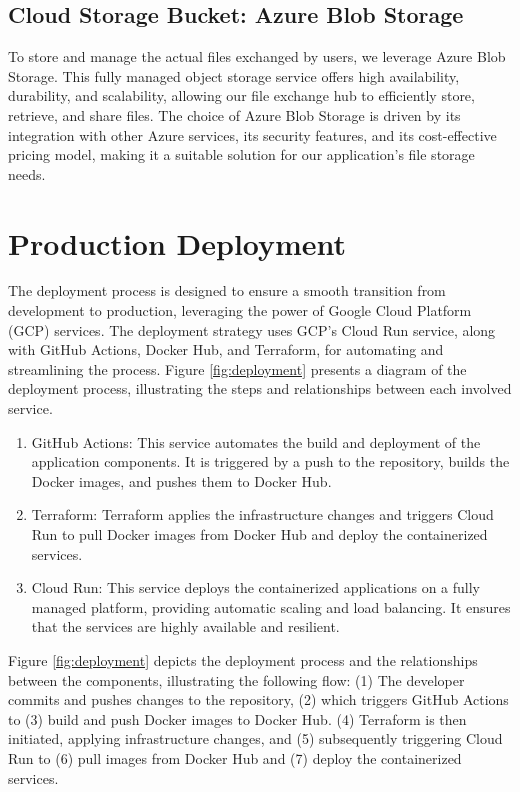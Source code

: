\documentclass[a4paper,fleqn]{cas-dc}
\begin{document}
\subsection{Cloud Storage Bucket: Azure Blob Storage}

To store and manage the actual files exchanged by users, we leverage Azure Blob Storage. This fully managed object storage service offers high availability, durability, and scalability, allowing our file exchange hub to efficiently store, retrieve, and share files. The choice of Azure Blob Storage is driven by its integration with other Azure services, its security features, and its cost-effective pricing model, making it a suitable solution for our application's file storage needs.

\section{Production Deployment} \label{sec:deployment}

The deployment process is designed to ensure a smooth transition from development to production, leveraging the power of Google Cloud Platform (GCP) services. The deployment strategy uses GCP's Cloud Run service, along with GitHub Actions, Docker Hub, and Terraform, for automating and streamlining the process. Figure \ref{fig:deployment} presents a diagram of the deployment process, illustrating the steps and relationships between each involved service.

\begin{enumerate}
\item GitHub Actions: This service automates the build and deployment of the application components. It is triggered by a push to the repository, builds the Docker images, and pushes them to Docker Hub.
\item Terraform: Terraform applies the infrastructure changes and triggers Cloud Run to pull Docker images from Docker Hub and deploy the containerized services.
\item Cloud Run: This service deploys the containerized applications on a fully managed platform, providing automatic scaling and load balancing. It ensures that the services are highly available and resilient.
\end{enumerate}

Figure \ref{fig:deployment} depicts the deployment process and the relationships between the components, illustrating the following flow: (1) The developer commits and pushes changes to the repository, (2) which triggers GitHub Actions to (3) build and push Docker images to Docker Hub. (4) Terraform is then initiated, applying infrastructure changes, and (5) subsequently triggering Cloud Run to (6) pull images from Docker Hub and (7) deploy the containerized services.
\end{document}

